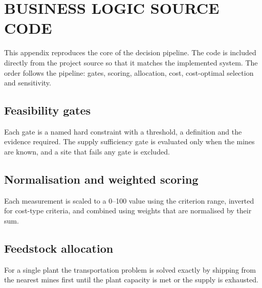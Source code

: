 \documentclass[12pt,a4paper]{report}
\begin{document}


\chapter{BUSINESS LOGIC SOURCE CODE}
This appendix reproduces the core of the decision pipeline. The code is
included directly from the project source so that it matches the
implemented system. The order follows the pipeline: gates, scoring,
allocation, cost, cost-optimal selection and sensitivity.

\section{Feasibility gates}
Each gate is a named hard constraint with a threshold, a definition and
the evidence required. The supply sufficiency gate is evaluated only when
the mines are known, and a site that fails any gate is excluded.





\section{Normalisation and weighted scoring}
Each measurement is scaled to a 0--100 value using the criterion range,
inverted for cost-type criteria, and combined using weights that are
normalised by their sum.



\section{Feedstock allocation}
For a single plant the transportation problem is solved exactly by
shipping from the nearest mines first until the plant capacity is met or
the supply is exhausted.
\end{document}
